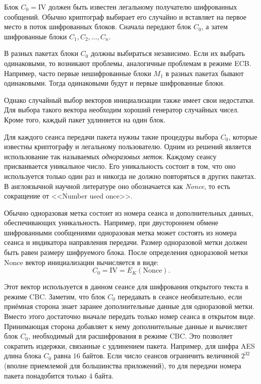 Блок $C_0 = \textrm{IV}$ должен быть известен легальному получателю шифрованных сообщений. Обычно криптограф выбирает его случайно и вставляет на первое место в поток шифрованных блоков. Сначала передают блок $C_0$, а затем шифрованные блоки $C_1, C_2, \ldots, C_n$.

В разных пакетах блоки $C_0$ должны выбираться независимо. Если их выбрать одинаковыми, то возникают проблемы, аналогичные проблемам в режиме ECB. Например, часто первые нешифрованные блоки $M_1$ в разных пакетах бывают одинаковыми. Тогда одинаковыми будут и первые шифрованные блоки.

Однако случайный выбор векторов инициализации также имеет свои недостатки. Для выбора такого вектора необходим хороший генератор случайных чисел. Кроме того, каждый пакет удлиняется на один блок.

Для каждого сеанса передачи пакета нужны такие процедуры выбора $C_0$, которые известны криптографу и легальному пользователю. Одним из решений является использование так называемых \emph{одноразовых меток}. Каждому сеансу присваивается уникальное число. Его уникальность состоит в том, что оно используется только один раз и никогда не должно повторяться в других пакетах. В англоязычной научной литературе оно обозначается как \emph{Nonce}, то есть сокращение от <<Number used once>>.

Обычно одноразовая метка состоит из номера сеанса и дополнительных данных, обеспечивающих уникальность. Например, при двустороннем обмене шифрованными сообщениями одноразовая метка может состоять из номера сеанса и индикатора направления передачи. Размер одноразовой метки должен быть равен размеру шифруемого блока. После определения одноразовой метки $\textrm{Nonce}$ вектор инициализации вычисляется в виде:
    \[ C_0 = \textrm{IV} = E_K(\textrm{Nonce}). \]

Этот вектор используется в данном сеансе для шифрования открытого текста в режиме CBC. Заметим, что блок $C_0$ передавать в сеансе необязательно, если приёмная сторона знает заранее дополнительные данные для одноразовой метки. Вместо этого достаточно вначале передать только номер сеанса в открытом виде. Принимающая сторона добавляет к нему дополнительные данные и вычисляет блок $C_0$, необходимый для расшифрования в режиме CBC. Это позволяет сократить издержки, связанные с удлинением пакета. Например, для шифра AES длина блока $C_0$ равна $16$ байтов. Если число сеансов ограничить величиной $2^{32}$ (вполне приемлемой для большинства приложений), то для передачи номера пакета понадобится только $4$ байта.

